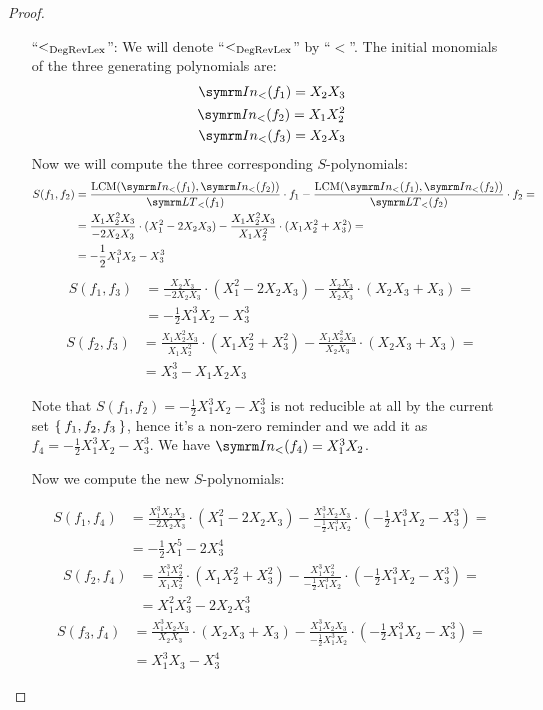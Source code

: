 \begin{proof}
\begin{itemize}
    \item[``\(<_\mathrm{DegRevLex}\)'':] We will denote ``\(<_\mathrm{DegRevLex}\)'' by ``\(<\)''. The initial monomials of the three generating polynomials are:
    \begin{align*}
        \In(f_1) = X_2 X_3 \\
        \In(f_2) = X_1 X_2^2 \\
        \In(f_3) = X_2 X_3
    \end{align*}
    Now we will compute the three corresponding \(S\)-polynomials:
    \begin{align*}
        S(f_1, f_2) &= \frac{\LCM(\In(f_1), \In(f_2))}{\LT(f_1)} \cdot f_1 - \frac{\LCM(\In(f_1), \In(f_2))}{\LT(f_2)} \cdot f_2 = \\
        &= \frac{X_1 X_2^2 X_3}{-2 X_2 X_3} \cdot (X_1^2 - 2 X_2 X_3) - \frac{X_1 X_2^2 X_3}{X_1 X_2^2} \cdot (X_1 X_2^2 + X_3^2) = \\
        &= -\frac{1}{2} X_1^3 X_2 - X_3^3
    \end{align*}
    \begin{align*}
        S(f_1, f_3) &= \frac{X_2 X_3}{-2 X_2 X_3} \cdot (X_1^2 - 2 X_2 X_3) - \frac{X_2 X_3}{X_2 X_3} \cdot (X_2 X_3 + X_3) = \\
        &= -\frac{1}{2} X_1^3 X_2 - X_3^3
    \end{align*}
    \begin{align*}
        S(f_2, f_3) &= \frac{X_1 X_2^2 X_3}{X_1 X_2^2} \cdot (X_1 X_2^2 + X_3^2) - \frac{X_1 X_2^2 X_3}{X_2 X_3} \cdot (X_2 X_3 + X_3) = \\
        &= X_3^3 - X_1 X_2 X_3
    \end{align*}
    
    Note that \(S(f_1, f_2) = -\frac{1}{2} X_1^3 X_2 - X_3^3\) is not reducible at all by the current set \(\Set{f_1, f_2, f_3}\), hence it's a non-zero reminder and we add it as \(f_4 = -\frac{1}{2} X_1^3 X_2 - X_3^3\). We have \(\In(f_4) = X_1^3 X_2\).
    
    Now we compute the new \(S\)-polynomials:
    
    \begin{align*}
        S(f_1, f_4) &= \frac{X_1^3 X_2 X_3}{-2 X_2 X_3} \cdot (X_1^2 - 2 X_2 X_3) - \frac{X_1^3 X_2 X_3}{-\frac{1}{2} X_1^3 X_2} \cdot (- \frac{1}{2} X_1^3 X_2 - X_3^3) = \\
        &= -\frac{1}{2} X_1^5 - 2 X_3^4
    \end{align*}
    \begin{align*}
        S(f_2, f_4) &= \frac{X_1^3 X_2^2}{X_1 X_2^2} \cdot (X_1 X_2^2 + X_3^2) - \frac{X_1^3 X_2^2}{-\frac{1}{2} X_1^3 X_2} \cdot (-\frac{1}{2} X_1^3 X_2 - X_3^3) = \\
        &= X_1^2 X_3^2 - 2 X_2 X_3^3
    \end{align*}
    \begin{align*}
        S(f_3, f_4) &= \frac{X_1^3 X_2 X_3}{X_2 X_3} \cdot (X_2 X_3 + X_3) - \frac{X_1^3 X_2 X_3}{-\frac{1}{2} X_1^3 X_2} \cdot (-\frac{1}{2} X_1^3 X_2 - X_3^3) = \\
        &= X_1^3 X_3 - X_3^4
    \end{align*}
    

\end{itemize}
\end{proof}
